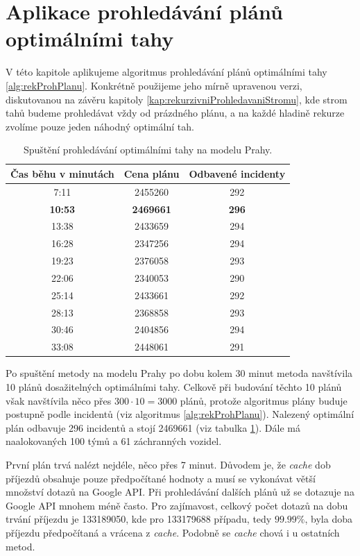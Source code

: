 \section{Aplikace prohledávání plánů optimálními \linebreak tahy} \label{kap:aplikaceTabu}

V této kapitole aplikujeme algoritmus prohledávání plánů optimálními tahy \ref{alg:rekProhPlanu}.
Konkrétně použijeme jeho mírně upravenou verzi, diskutovanou na závěru kapitoly \ref{kap:rekurzivniProhledavaniStromu},
kde strom tahů budeme prohledávat vždy od prázdného plánu, a na každé hladině rekurze zvolíme pouze jeden náhodný optimální tah.

\begin{table}[h!]
\centering
\begin{tabular}{|c|c|c|}
\hline
\textbf{Čas běhu v minutách} & \textbf{Cena plánu} & \textbf{Odbavené incidenty} \\
\hline
7:11 & 2455260 & 292 \\
\hline
  \textbf{10:53} & \textbf{2469661} & \textbf{296} \\
\hline
13:38 & 2433659 & 294 \\
\hline
16:28 & 2347256 & 294 \\
\hline
19:23 & 2376058 & 293 \\
\hline
22:06 & 2340053 & 290 \\
\hline
25:14 & 2433661 & 292 \\
\hline
28:13 & 2368858 & 293 \\
\hline
30:46 & 2404856 & 294 \\
\hline
33:08 & 2448061 & 291 \\
\hline
\end{tabular}
\caption{Spuštění prohledávání optimálními tahy na modelu Prahy.}
\label{table:optimalMovesTabulka}
\end{table}

Po spuštění metody na modelu Prahy po dobu kolem 30 minut metoda navštívila 10 plánů dosažitelných optimálními tahy.
Celkově při budování těchto 10 plánů však navštívila něco přes $300 \cdot 10 = 3000$ plánů, protože algoritmus plány buduje postupně podle incidentů (viz algoritmus \ref{alg:rekProhPlanu}).
Nalezený optimální plán odbavuje 296 incidentů a stojí 2469661 (viz tabulka \ref{table:optimalMovesTabulka}).
Dále má naalokovaných 100 týmů a 61 záchranných vozidel.

První plán trvá nalézt nejdéle, něco přes 7 minut. Důvodem je, že \textit{cache} dob příjezdů obsahuje pouze předpočítané hodnoty a musí se vykonávat větší množství
dotazů na Google API.
Při prohledávání dalších plánů už se dotazuje na Google API mnohem méně často.
Pro zajímavost, celkový počet dotazů na dobu trvání příjezdu je 133189050, kde pro 133179688 případu, tedy $99.99\%$, byla doba příjezdu předpočítaná a vrácena z \textit{cache}.
Podobně se \textit{cache} chová i u ostatních metod.

